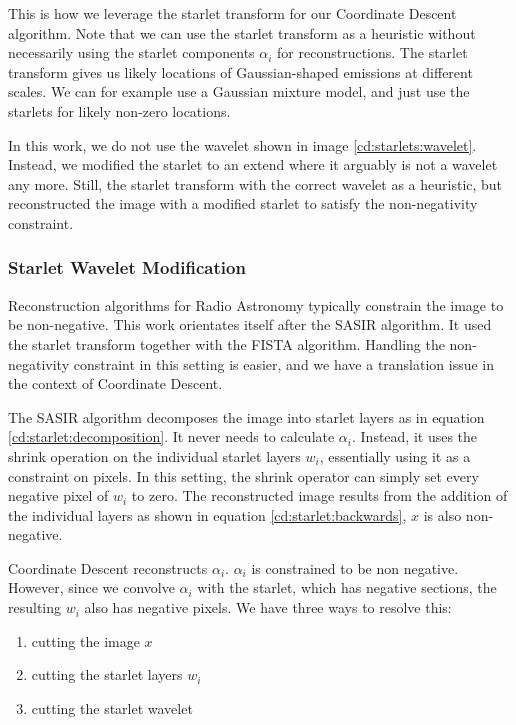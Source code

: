 This is how we  leverage the starlet transform for our Coordinate Descent algorithm. Note that we can use the starlet transform as a heuristic without necessarily using the starlet components $\alpha_i$ for reconstructions. The starlet transform gives us likely locations of Gaussian-shaped emissions at different scales. We can for example use a Gaussian mixture model, and just use the starlets for likely non-zero locations. 

In this work, we do not use the wavelet shown in image \ref{cd:starlets:wavelet}. Instead, we modified the starlet to an extend where it arguably is not a wavelet any more. Still, the starlet transform with the correct wavelet as a heuristic, but reconstructed the image with a modified starlet to satisfy the non-negativity constraint. 


\subsubsection{Starlet Wavelet Modification}
Reconstruction algorithms for Radio Astronomy typically constrain the image to be non-negative\cite{mcewen2011compressed}. This work orientates itself after the SASIR algorithm\cite{girard2015sparse}. It used the starlet transform together with the FISTA algorithm. Handling the non-negativity constraint in this setting is easier, and we have a translation issue in the context of Coordinate Descent.

The SASIR algorithm decomposes the image into starlet layers as in equation \eqref{cd:starlet:decomposition}. It never needs to calculate $\alpha_i$. Instead, it uses the shrink operation on the individual starlet layers $w_i$, essentially using it as a constraint on pixels. In this setting, the shrink operator can simply set every negative pixel of $w_i$ to zero. The reconstructed image results from the addition of the individual layers as shown in equation \ref{cd:starlet:backwards}, $x$ is also non-negative.

Coordinate Descent reconstructs $\alpha_i$. $\alpha_i$ is constrained to be non negative. However, since we convolve $\alpha_i$ with the starlet, which has negative sections, the resulting $w_i$ also has negative pixels. We have three ways to resolve this:
\begin{enumerate}
	\item cutting the image $x$
	\item cutting the starlet layers $w_i$
	\item cutting the starlet wavelet
\end{enumerate}



